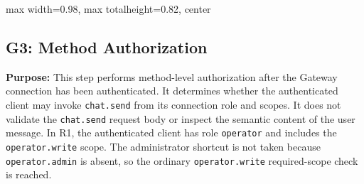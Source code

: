 \begin{center}
\begin{adjustbox}{
max width=0.98\textwidth,
max totalheight=0.82\textheight,
center
}

\end{adjustbox}

\end{center}

\subsection*{G3: Method Authorization}

\textbf{Purpose:}
This step performs method-level authorization after the Gateway connection
has been authenticated. It determines whether the authenticated client may
invoke \texttt{chat.send} from its connection role and scopes. It does not
validate the \texttt{chat.send} request body or inspect the semantic content
of the user message. In R1, the authenticated client has role
\texttt{operator} and includes the \texttt{operator.write} scope. The
administrator shortcut is not taken because \texttt{operator.admin} is
absent, so the ordinary \texttt{operator.write} required-scope check is
reached.

\vspace{2mm}

\begingroup

\setlength{\LTpre}{0pt}
\setlength{\LTpost}{0pt}
\renewcommand{\arraystretch}{1.08}

